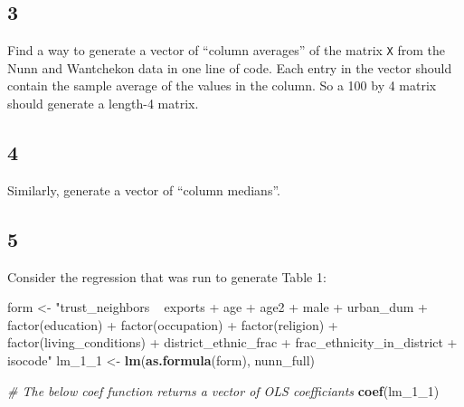 \documentclass[]{book}
\newenvironment{Shaded}{\begin{snugshade}}{\end{snugshade}}
\newcommand{\CommentTok}[1]{\textcolor[rgb]{0.56,0.35,0.01}{\textit{#1}}}
\newcommand{\DecValTok}[1]{\textcolor[rgb]{0.00,0.00,0.81}{#1}}
\newcommand{\KeywordTok}[1]{\textcolor[rgb]{0.13,0.29,0.53}{\textbf{#1}}}
\newcommand{\NormalTok}[1]{#1}
\newcommand{\StringTok}[1]{\textcolor[rgb]{0.31,0.60,0.02}{#1}}
\theoremstyle{definition}
\theoremstyle{definition}
\theoremstyle{definition}
\theoremstyle{remark}
\begin{document}
\begin{Shaded}
\begin{Highlighting}[]
\begin{Shaded}
\begin{Highlighting}[]
\hypertarget{section-11}{%
\subsection*{3}\label{section-11}}

Find a way to generate a vector of ``column averages'' of the matrix \texttt{X} from the Nunn and Wantchekon data in one line of code. Each entry in the vector should contain the sample average of the values in the column. So a 100 by 4 matrix should generate a length-4 matrix.

\hypertarget{section-12}{%
\subsection*{4}\label{section-12}}

Similarly, generate a vector of ``column medians''.

\hypertarget{section-13}{%
\subsection*{5}\label{section-13}}

Consider the regression that was run to generate Table 1:

\begin{Shaded}
\begin{Highlighting}[]
\NormalTok{form <-}\StringTok{ "trust_neighbors ~ exports + age + age2 +  male + urban_dum + factor(education) + factor(occupation) + factor(religion) + factor(living_conditions) + district_ethnic_frac + frac_ethnicity_in_district + isocode"}
\NormalTok{lm_}\DecValTok{1}\NormalTok{_}\DecValTok{1}\NormalTok{ <-}\StringTok{ }\KeywordTok{lm}\NormalTok{(}\KeywordTok{as.formula}\NormalTok{(form), nunn_full)}

\CommentTok{# The below coef function returns a vector of OLS coefficiants}
\KeywordTok{coef}\NormalTok{(lm_}\DecValTok{1}\NormalTok{_}\DecValTok{1}\NormalTok{)}
\end{Highlighting}
\end{Shaded}


\end{Highlighting}
\end{Shaded}
\end{Highlighting}
\end{Shaded}
\end{document}
